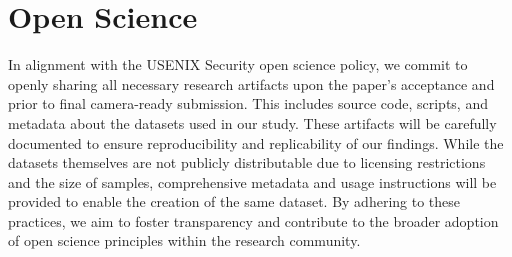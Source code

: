 \section{Open Science}

In alignment with the USENIX Security open science policy, we commit to openly sharing all necessary research artifacts upon the paper’s acceptance and prior to final camera-ready submission. This includes source code, scripts, and metadata about the datasets used in our study. These artifacts will be carefully documented to ensure reproducibility and replicability of our findings. While the datasets themselves are not publicly distributable due to licensing restrictions and the size of samples, comprehensive metadata and usage instructions will be provided to enable the creation of the same dataset. By adhering to these practices, we aim to foster transparency and contribute to the broader adoption of open science principles within the research community.